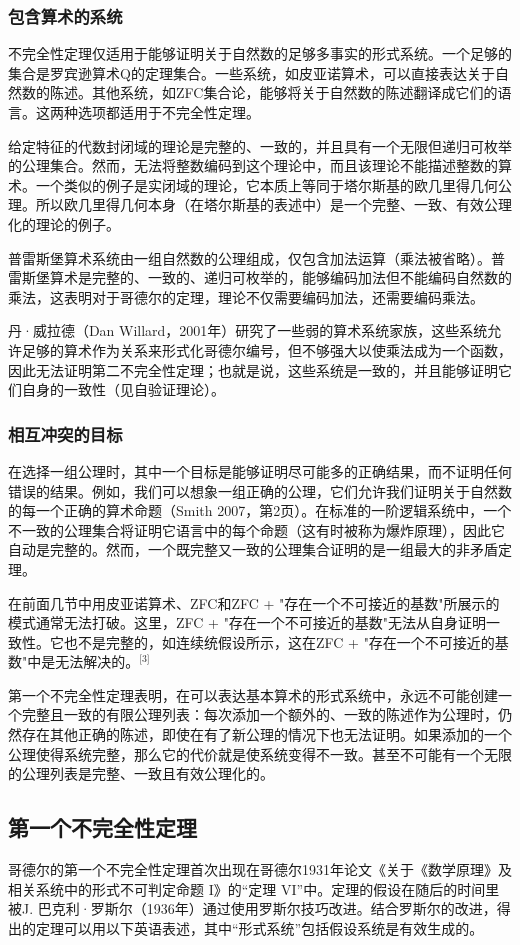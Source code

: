 \subsubsection{包含算术的系统}
不完全性定理仅适用于能够证明关于自然数的足够多事实的形式系统。一个足够的集合是罗宾逊算术Q的定理集合。一些系统，如皮亚诺算术，可以直接表达关于自然数的陈述。其他系统，如ZFC集合论，能够将关于自然数的陈述翻译成它们的语言。这两种选项都适用于不完全性定理。

给定特征的代数封闭域的理论是完整的、一致的，并且具有一个无限但递归可枚举的公理集合。然而，无法将整数编码到这个理论中，而且该理论不能描述整数的算术。一个类似的例子是实闭域的理论，它本质上等同于塔尔斯基的欧几里得几何公理。所以欧几里得几何本身（在塔尔斯基的表述中）是一个完整、一致、有效公理化的理论的例子。

普雷斯堡算术系统由一组自然数的公理组成，仅包含加法运算（乘法被省略）。普雷斯堡算术是完整的、一致的、递归可枚举的，能够编码加法但不能编码自然数的乘法，这表明对于哥德尔的定理，理论不仅需要编码加法，还需要编码乘法。

丹·威拉德（Dan Willard，2001年）研究了一些弱的算术系统家族，这些系统允许足够的算术作为关系来形式化哥德尔编号，但不够强大以使乘法成为一个函数，因此无法证明第二不完全性定理；也就是说，这些系统是一致的，并且能够证明它们自身的一致性（见自验证理论）。
\subsubsection{相互冲突的目标} 
在选择一组公理时，其中一个目标是能够证明尽可能多的正确结果，而不证明任何错误的结果。例如，我们可以想象一组正确的公理，它们允许我们证明关于自然数的每一个正确的算术命题（Smith 2007，第2页）。在标准的一阶逻辑系统中，一个不一致的公理集合将证明它语言中的每个命题（这有时被称为爆炸原理），因此它自动是完整的。然而，一个既完整又一致的公理集合证明的是一组最大的非矛盾定理。

在前面几节中用皮亚诺算术、ZFC和ZFC + "存在一个不可接近的基数"所展示的模式通常无法打破。这里，ZFC + "存在一个不可接近的基数"无法从自身证明一致性。它也不是完整的，如连续统假设所示，这在ZFC + "存在一个不可接近的基数"中是无法解决的。\(^\text{[3]}\)

第一个不完全性定理表明，在可以表达基本算术的形式系统中，永远不可能创建一个完整且一致的有限公理列表：每次添加一个额外的、一致的陈述作为公理时，仍然存在其他正确的陈述，即使在有了新公理的情况下也无法证明。如果添加的一个公理使得系统完整，那么它的代价就是使系统变得不一致。甚至不可能有一个无限的公理列表是完整、一致且有效公理化的。
\subsection{第一个不完全性定理}  
哥德尔的第一个不完全性定理首次出现在哥德尔1931年论文《关于《数学原理》及相关系统中的形式不可判定命题 I》的“定理 VI”中。定理的假设在随后的时间里被J. 巴克利·罗斯尔（1936年）通过使用罗斯尔技巧改进。结合罗斯尔的改进，得出的定理可以用以下英语表述，其中“形式系统”包括假设系统是有效生成的。

